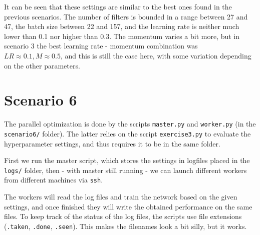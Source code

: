 \documentclass{article}
\begin{document}
        It can be seen that these settings are similar to the best ones found in the previous scenarios.
        The number of filters is bounded in a range between 27 and 47, the batch size between 22 and 157, and
        the learning rate is neither much lower than 0.1 nor higher than 0.3. The momentum varies a bit more, 
        but in scenario 3 the best learning rate - momentum combination was $LR \approx 0.1, M \approx 0.5$, and this is still the case here, 
        with some variation depending on the other parameters.
    
    
\section{Scenario 6}
    The parallel optimization is done by the scripts \texttt{master.py} and \texttt{worker.py} (in the \texttt{scenario6/} folder). 
    The latter relies on the script \texttt{exercise3.py} to evaluate the hyperparameter settings, and thus requires it to be in the same folder.
    
    First we run the master script, which stores the settings in logfiles placed in the \texttt{logs/} folder, 
    then - with master still running - we can launch different workers from different machines via \texttt{ssh}.
    
    The workers will read the log files and train the network based on the given settings, 
    and once finished they will write the obtained performance on the same files. 
    To keep track of the status of the log files, the scripts use file extensions (\texttt{.taken}, \texttt{.done}, \texttt{.seen}). 
    This makes the filenames look a bit silly, but it works.
    
\end{document}
